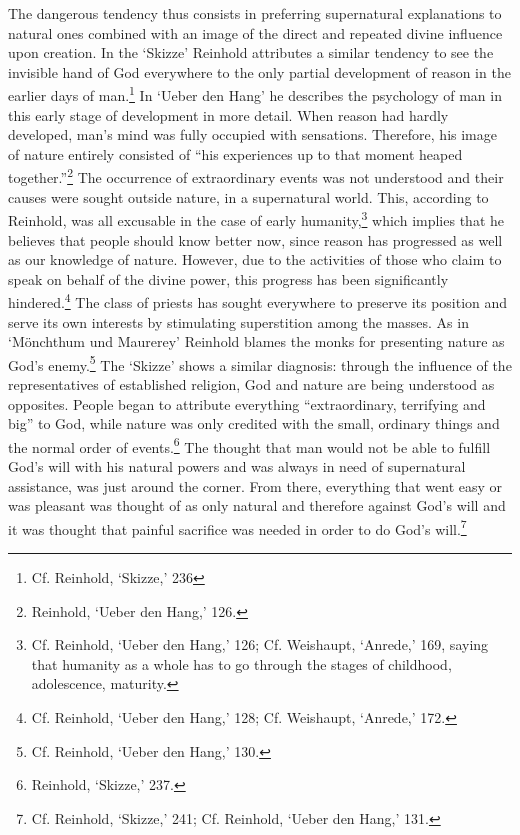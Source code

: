 The dangerous tendency thus consists in preferring supernatural explanations to natural ones combined with an image of the direct and repeated divine influence upon creation. In the `Skizze' Reinhold attributes a similar tendency to see the invisible hand of God everywhere to the only partial development of reason in the earlier days of man.\footnote{ Cf. Reinhold, `Skizze,' 236} In `Ueber den Hang' he describes the psychology of man in this early stage of development in more detail. When reason had hardly developed, man's mind was fully occupied with sensations. Therefore, his image of nature entirely consisted of ``his experiences up to that moment heaped together.''\footnote{ Reinhold, `Ueber den Hang,' 126.} The occurrence of extraordinary events was not understood and their causes were sought outside nature, in a supernatural world. This, according to Reinhold, was all excusable in the case of early humanity,\footnote{ Cf. Reinhold, `Ueber den Hang,' 126; Cf. Weishaupt, `Anrede,' 169, saying that humanity as a whole has to go through the stages of childhood, adolescence, maturity. } which implies that he believes that people should know better now, since reason has progressed as well as our knowledge of nature. However, due to the activities of those who claim to speak on behalf of the divine power, this progress has been significantly hindered.\footnote{ Cf. Reinhold, `Ueber den Hang,' 128; Cf. Weishaupt, `Anrede,' 172.} The class of priests has sought everywhere to preserve its position and serve its own interests by stimulating superstition among the masses. As in `M\"{o}nchthum und Maurerey' Reinhold blames the monks for presenting nature as God's enemy.\footnote{ Cf. Reinhold, `Ueber den Hang,' 130.} The `Skizze' shows a similar diagnosis: through the influence of the representatives of established religion, God and nature are being understood as opposites. People began to attribute everything ``extraordinary, terrifying and big'' to God, while nature was only credited with the small, ordinary things and the normal order of events.\footnote{ Reinhold, `Skizze,' 237.} The thought that man would not be able to fulfill God's will with his natural powers and was always in need of supernatural assistance, was just around the corner. From there, everything that went easy or was pleasant was thought of as only natural and therefore against God's will and it was thought that painful sacrifice was needed in order to do God's will.\footnote{ Cf. Reinhold, `Skizze,' 241; Cf. Reinhold, `Ueber den Hang,' 131.} 

